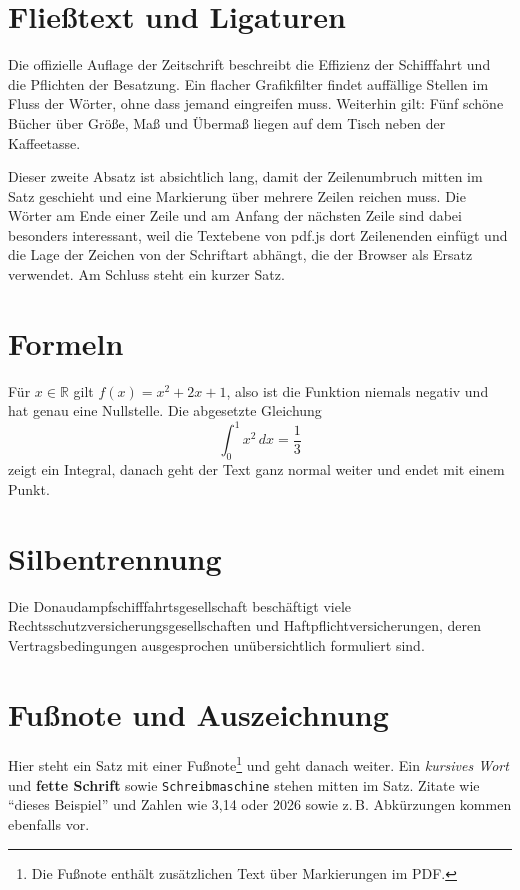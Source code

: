 \documentclass[11pt,a4paper]{article}
\begin{document}
\section{Fließtext und Ligaturen}

Die offizielle Auflage der Zeitschrift beschreibt die Effizienz der Schifffahrt und die Pflichten der Besatzung.
Ein flacher Grafikfilter findet auffällige Stellen im Fluss der Wörter, ohne dass jemand eingreifen muss.
Weiterhin gilt: Fünf schöne Bücher über Größe, Maß und Übermaß liegen auf dem Tisch neben der Kaffeetasse.

Dieser zweite Absatz ist absichtlich lang, damit der Zeilenumbruch mitten im Satz geschieht und eine Markierung
über mehrere Zeilen reichen muss. Die Wörter am Ende einer Zeile und am Anfang der nächsten Zeile sind dabei
besonders interessant, weil die Textebene von pdf.js dort Zeilenenden einfügt und die Lage der Zeichen von der
Schriftart abhängt, die der Browser als Ersatz verwendet. Am Schluss steht ein kurzer Satz.

\section{Formeln}

Für $x \in \mathbb{R}$ gilt $f(x) = x^2 + 2x + 1$, also ist die Funktion niemals negativ und hat genau eine Nullstelle.
Die abgesetzte Gleichung
\begin{equation}
    \int_0^1 x^2 \, dx = \frac{1}{3}
\end{equation}
zeigt ein Integral, danach geht der Text ganz normal weiter und endet mit einem Punkt.

\section{Silbentrennung}

\begin{minipage}{0.42\textwidth}
Die Donaudampfschifffahrtsgesellschaft beschäftigt viele Rechtsschutzversicherungsgesellschaften und
Haftpflichtversicherungen, deren Vertragsbedingungen ausgesprochen unübersichtlich formuliert sind.
\end{minipage}

\section{Fußnote und Auszeichnung}

Hier steht ein Satz mit einer Fußnote\footnote{Die Fußnote enthält zusätzlichen Text über Markierungen im PDF.} und geht danach weiter.
Ein \emph{kursives Wort} und \textbf{fette Schrift} sowie \texttt{Schreibmaschine} stehen mitten im Satz.
Zitate wie \enquote{dieses Beispiel} und Zahlen wie 3,14 oder 2026 sowie z.\,B. Abkürzungen kommen ebenfalls vor.
\end{document}
